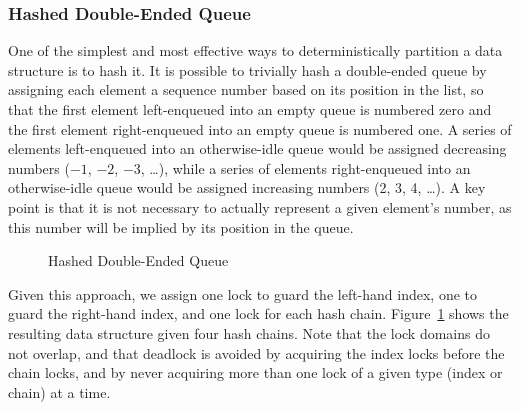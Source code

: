 \subsubsection{Hashed Double-Ended Queue}
\label{sec:SMPdesign:Hashed Double-Ended Queue}

One of the simplest and most effective ways to deterministically
partition a data structure is to hash it.
It is possible to trivially hash a double-ended queue by assigning
each element a sequence number based on its position in the list,
so that the first element left-enqueued into an empty queue is numbered
zero and the first element right-enqueued into an empty queue is numbered
one.
A series of elements left-enqueued into an otherwise-idle queue would
be assigned decreasing numbers ($-1$, $-2$, $-3$, \ldots), while a series of
elements right-enqueued into an otherwise-idle queue would be assigned
increasing numbers (2, 3, 4, \ldots).
A key point is that it is not necessary to actually represent a given
element's number, as this number will be implied by its position in
the queue.

\begin{figure}[tb]
\centering
{}
\caption{Hashed Double-Ended Queue}
\label{fig:SMPdesign:Hashed Double-Ended Queue}
\end{figure}

Given this approach, we assign one lock to guard the left-hand index,
one to guard the right-hand index, and one lock for each hash chain.
Figure~\ref{fig:SMPdesign:Hashed Double-Ended Queue} shows the resulting
data structure given four hash chains.
Note that the lock domains do not overlap, and that deadlock is avoided
by acquiring the index locks before the chain locks, and by never
acquiring more than one lock of a given type (index or chain) at a time.

